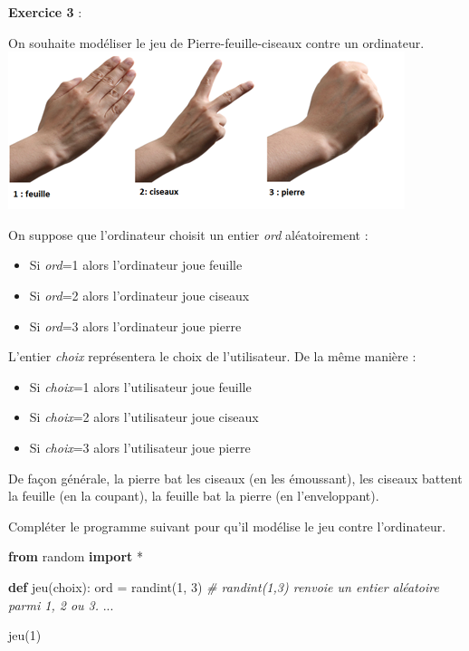 \documentclass[
  paper=a4,
  ,captions=tableheading
]{scrartcl}
\newenvironment{Shaded}{}{}
\newcommand{\BuiltInTok}[1]{\textcolor[rgb]{0.00,0.50,0.00}{#1}}
\newcommand{\CommentTok}[1]{\textcolor[rgb]{0.38,0.63,0.69}{\textit{#1}}}
\newcommand{\DecValTok}[1]{\textcolor[rgb]{0.25,0.63,0.44}{#1}}
\newcommand{\ImportTok}[1]{\textcolor[rgb]{0.00,0.50,0.00}{\textbf{#1}}}
\newcommand{\KeywordTok}[1]{\textcolor[rgb]{0.00,0.44,0.13}{\textbf{#1}}}
\newcommand{\NormalTok}[1]{#1}
\newcommand{\OperatorTok}[1]{\textcolor[rgb]{0.40,0.40,0.40}{#1}}
\begin{document}
\textbf{Exercice 3} :

On souhaite modéliser le jeu de Pierre-feuille-ciseaux contre un
ordinateur.\\
\includegraphics{images/1-image1.png}

On suppose que l'ordinateur choisit un entier \emph{ord} aléatoirement :

\begin{itemize}
\item
  Si \emph{ord}=1 alors l'ordinateur joue feuille
\item
  Si \emph{ord}=2 alors l'ordinateur joue ciseaux
\item
  Si \emph{ord}=3 alors l'ordinateur joue pierre
\end{itemize}

L'entier \emph{choix} représentera le choix de l'utilisateur. De la même
manière :

\begin{itemize}
\item
  Si \emph{choix}=1 alors l'utilisateur joue feuille
\item
  Si \emph{choix}=2 alors l'utilisateur joue ciseaux
\item
  Si \emph{choix}=3 alors l'utilisateur joue pierre
\end{itemize}

De façon générale, la pierre bat les ciseaux (en les émoussant), les
ciseaux battent la feuille (en la coupant), la feuille bat la pierre (en
l'enveloppant).

Compléter le programme suivant pour qu'il modélise le jeu contre
l'ordinateur.

\begin{Shaded}
\begin{Highlighting}[]
\ImportTok{from}\NormalTok{ random }\ImportTok{import} \OperatorTok{*}


\KeywordTok{def}\NormalTok{ jeu(choix):}
    \BuiltInTok{ord} \OperatorTok{=}\NormalTok{ randint(}\DecValTok{1}\NormalTok{, }\DecValTok{3}\NormalTok{)  }\CommentTok{\# randint(1,3) renvoie un entier aléatoire parmi 1, 2 ou 3.}
\NormalTok{    ...}


\NormalTok{jeu(}\DecValTok{1}\NormalTok{)}
\end{Highlighting}
\end{Shaded}
\end{document}

